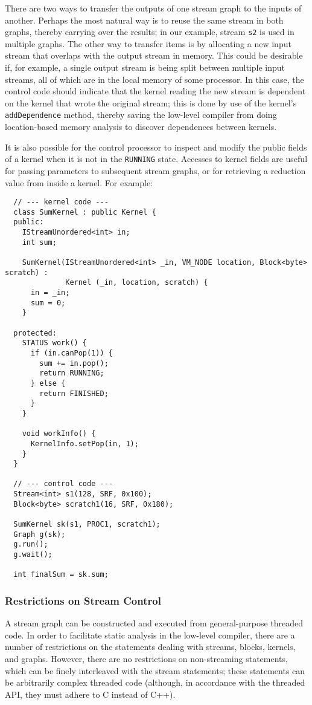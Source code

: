 There are two ways to transfer the outputs of one stream graph to the
inputs of another.  Perhaps the most natural way is to reuse the same
stream in both graphs, thereby carrying over the results; in our
example, stream {\tt s2} is used in multiple graphs.  The other way to
transfer items is by allocating a new input stream that overlaps with
the output stream in memory.  This could be desirable if, for example,
a single output stream is being split between multiple input streams,
all of which are in the local memory of some processor.  In this case,
the control code should indicate that the kernel reading the new
stream is dependent on the kernel that wrote the original stream; this
is done by use of the kernel's {\tt addDependence} method, thereby
saving the low-level compiler from doing location-based memory
analysis to discover dependences between kernels.

It is also possible for the control processor to inspect and modify
the public fields of a kernel when it is not in the {\tt RUNNING}
state.  Accesses to kernel fields are useful for passing parameters to
subsequent stream graphs, or for retrieving a reduction value from
inside a kernel.  For example: 
{\small
\begin{verbatim}
  // --- kernel code ---
  class SumKernel : public Kernel {
  public:
    IStreamUnordered<int> in;
    int sum;

    SumKernel(IStreamUnordered<int> _in, VM_NODE location, Block<byte> scratch) : 
              Kernel (_in, location, scratch) {
      in = _in;
      sum = 0;
    }

  protected:
    STATUS work() {
      if (in.canPop(1)) {
        sum += in.pop();
        return RUNNING;
      } else {
        return FINISHED;
      }
    }

    void workInfo() {
      KernelInfo.setPop(in, 1);
    }
  }

  // --- control code ---
  Stream<int> s1(128, SRF, 0x100);
  Block<byte> scratch1(16, SRF, 0x180);

  SumKernel sk(s1, PROC1, scratch1);
  Graph g(sk);
  g.run();
  g.wait();

  int finalSum = sk.sum;
\end{verbatim}}

\subsubsection{Restrictions on Stream Control}

A stream graph can be constructed and executed from general-purpose
threaded code.  In order to facilitate static analysis in the
low-level compiler, there are a number of restrictions on the
statements dealing with streams, blocks, kernels, and graphs.
However, there are no restrictions on non-streaming statements, which
can be finely interleaved with the stream statements; these statements
can be arbitrarily complex threaded code (although, in accordance with
the threaded API, they must adhere to C instead of C++).

